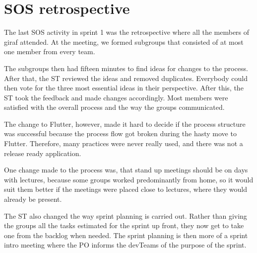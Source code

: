 \section{SOS retrospective}

The last \gls{SOS} activity in sprint 1 was the retrospective where all the members of \gls{giraf} attended. At the meeting, we formed subgroups that consisted of at most one member from every team. 

The subgroups then had fifteen minutes to find ideas for changes to the process. After that, the \gls{ST} reviewed the ideas and removed duplicates. Everybody could then vote for the three most essential ideas in their perspective. After this, the \gls{ST} took the feedback and made changes accordingly. Most members were satisfied with the overall process and the way the groups communicated.

The change to Flutter, however, made it hard to decide if the process structure was successful because the process flow got broken during the hasty move to Flutter. Therefore, many practices were never really used, and there was not a release ready application.

One change made to the process was, that stand up meetings should be on days with lectures, because some groups worked predominantly from home, so it would suit them better if the meetings were placed close to lectures, where they would already be present. 

The \gls{ST} also changed the way sprint planning is carried out. Rather than giving the groups all the tasks estimated for the sprint up front, they now get to take one from the backlog when needed. The sprint planning is then more of a sprint intro meeting where the \gls{PO} informs the \glspl{devTeam} of the purpose of the sprint. 
